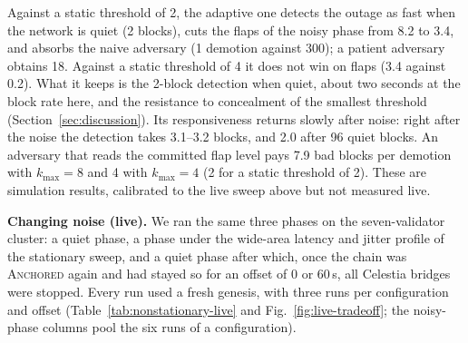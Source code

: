 \begin{table}[h]
\caption{Static and adaptive down thresholds in the in-process simulation
(blocks; mean $\pm$ 95\% interval over 200 paired noise schedules). ``Detect
after noise'' starts the outage as soon as the chain is \textsc{Anchored}
again. Repeated trigger: demotions in 1200 blocks. Outage hidden: placements
out of 35 of three Byzantine proposers that keep a real DA outage from being
detected, with the chain quiet and with the flap level at its highest.}
\label{tab:adaptive-sim}
\centering
\footnotesize
\resizebox{\linewidth}{!}{}
\end{table}

Against a static threshold of 2, the adaptive one detects the outage as fast
when the network is quiet (2 blocks), cuts the flaps of the noisy phase from 8.2
to 3.4, and absorbs the naive adversary (1 demotion against 300); a patient
adversary obtains 18. Against a static threshold of 4 it does not win on flaps
(3.4 against 0.2). What it keeps is the 2-block detection when quiet, about two
seconds at the block rate here, and the resistance to concealment of the
smallest threshold (Section~\ref{sec:discussion}). Its responsiveness returns
slowly after noise: right after the noise the detection takes 3.1--3.2 blocks,
and 2.0 after 96 quiet blocks. An adversary that reads the committed flap level
pays 7.9 bad blocks per demotion with $k_{\max}{=}8$ and 4 with $k_{\max}{=}4$
(2 for a static threshold of 2). These are simulation results, calibrated to the
live sweep above but not measured live.

\textbf{Changing noise (live).} We ran the same three phases on the seven-validator
cluster: a quiet phase, a phase under the wide-area latency and jitter profile of
the stationary sweep, and a quiet phase after which, once the chain was
\textsc{Anchored} again and had stayed so for an offset of 0 or 60\,s, all
Celestia bridges were stopped. Every run used a fresh genesis, with three runs per
configuration and offset (Table~\ref{tab:nonstationary-live} and
Fig.~\ref{fig:live-tradeoff}; the noisy-phase columns pool the six runs of a
configuration).

\begin{table}[h]
\caption{Live three-phase runs: mean (range) over three runs per offset (the noisy
phase pools six). Detection is the time from the bridge stop to the first
non-\textsc{Anchored} state.}
\label{tab:nonstationary-live}
\centering
\scriptsize
\resizebox{\linewidth}{!}{}
\end{table}

